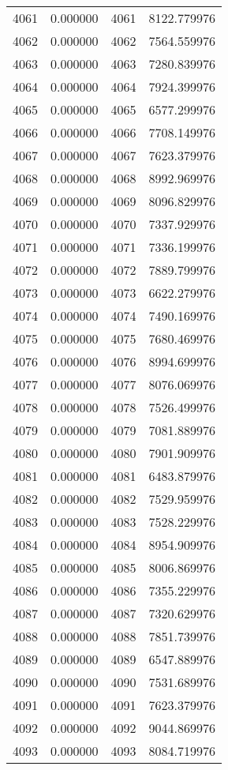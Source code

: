 \documentclass[12pt]{article}
\begin{document}
\begin{longtable}{@{}cccc@{}}
4061 & 0.000000 & 4061 & 8122.779976 \\
4062 & 0.000000 & 4062 & 7564.559976 \\
4063 & 0.000000 & 4063 & 7280.839976 \\
4064 & 0.000000 & 4064 & 7924.399976 \\
4065 & 0.000000 & 4065 & 6577.299976 \\
4066 & 0.000000 & 4066 & 7708.149976 \\
4067 & 0.000000 & 4067 & 7623.379976 \\
4068 & 0.000000 & 4068 & 8992.969976 \\
4069 & 0.000000 & 4069 & 8096.829976 \\
4070 & 0.000000 & 4070 & 7337.929976 \\
4071 & 0.000000 & 4071 & 7336.199976 \\
4072 & 0.000000 & 4072 & 7889.799976 \\
4073 & 0.000000 & 4073 & 6622.279976 \\
4074 & 0.000000 & 4074 & 7490.169976 \\
4075 & 0.000000 & 4075 & 7680.469976 \\
4076 & 0.000000 & 4076 & 8994.699976 \\
4077 & 0.000000 & 4077 & 8076.069976 \\
4078 & 0.000000 & 4078 & 7526.499976 \\
4079 & 0.000000 & 4079 & 7081.889976 \\
4080 & 0.000000 & 4080 & 7901.909976 \\
4081 & 0.000000 & 4081 & 6483.879976 \\
4082 & 0.000000 & 4082 & 7529.959976 \\
4083 & 0.000000 & 4083 & 7528.229976 \\
4084 & 0.000000 & 4084 & 8954.909976 \\
4085 & 0.000000 & 4085 & 8006.869976 \\
4086 & 0.000000 & 4086 & 7355.229976 \\
4087 & 0.000000 & 4087 & 7320.629976 \\
4088 & 0.000000 & 4088 & 7851.739976 \\
4089 & 0.000000 & 4089 & 6547.889976 \\
4090 & 0.000000 & 4090 & 7531.689976 \\
4091 & 0.000000 & 4091 & 7623.379976 \\
4092 & 0.000000 & 4092 & 9044.869976 \\
4093 & 0.000000 & 4093 & 8084.719976 \\

\end{longtable}
\end{document}
